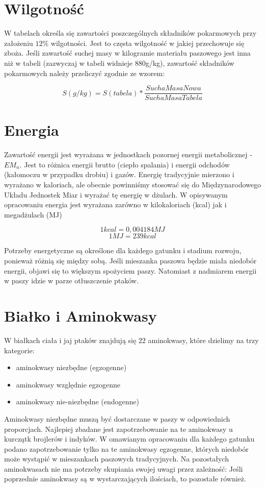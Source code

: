 \documentclass[shortabstract]{iithesis}
\begin{document}
\section{Wilgotność}
W tabelach określa się zawartości poszczególnych składników pokarmowych przy założeniu $12\%$ wilgotności. Jest to częsta wilgotność w jakiej przechowuje się zboża. 
Jeśli zawartość suchej masy w kilogramie materiału paszowego jest inna niż w tabeli (zazwyczaj w tabeli widnieje 880g/kg), zawartość składników pokarmowych należy przeliczyć zgodnie ze wzorem: 

$$ S(g/kg) = S(tabela) * \frac{SuchaMasaNowa}{Sucha Masa Tabela}  $$
 
 
 \section{Energia}
 Zawartość energii jest wyrażana w jednostkach pozornej energii metabolicznej - $EM_n$. Jest to różnica energii brutto (ciepło spalania) i energii odchodów (kałomoczu w przypadku drobiu) i gazów.
 Energię tradycyjnie mierzono i wyrażano w kaloriach, ale obecnie powinniśmy stosować się do Międzynarodowego Układu Jednostek Miar i wyrażać tę energię w dżulach. 
 W opisywanym opracowaniu energia jest wyrażana zarówno w kilokaloriach (kcal) jak i megadżulach (MJ)
 
$$1 kcal = 0,004184 MJ$$
$$1 MJ = 239 kcal$$ 

Potrzeby energetyczne są określone dla każdego gatunku i stadium rozwoju, ponieważ różnią się między sobą. Jeśli mieszanka paszowa będzie miała niedobór energii, objawi się to większym spożyciem paszy.
Natomiast z nadmiarem energii w paszy idzie w parze otłuszczenie ptaków.

\section{Białko i Aminokwasy}
W białkach ciała i jaj ptaków znajdują się $22$ aminokwasy, które dzielimy na trzy kategorie:
\begin{itemize}
\item aminokwasy niezbędne (egzogenne)
\item aminokwasy względnie egzogenne
\item aminokwasy nie-niezbędne (endogenne)
\end{itemize}

Aminokwasy niezbędne muszą być dostarczane w paszy w odpowiednich proporcjach. Najlepiej zbadane jest zapotrzebowanie na te aminokwasy u kurczątk brojlerów i indyków. 
W omawianym opracowaniu dla każdego gatunku podano zapotrzebowanie tylko na te aminokwasy egzogenne, których niedobór może wystąpić w mieszankach paszowych tradycyjnych.
Na pozostałych aminokwasach nie ma potrzeby skupiania swojej uwagi przez zależność: Jeśli poprzednie aminokwasy są w wystarczających ilościach, to pozostałe również.
\end{document}

